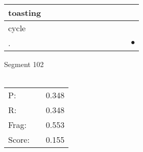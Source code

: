 \documentclass[landscape]{article}
\newcommand{\ssp}{\hspace{2pt}}
\newcommand{\mex}{\cellcolor{g}$\bullet$}
\begin{document}
\begin{tabular}{|l|p{10pt}|p{10pt}|p{10pt}|p{10pt}|p{10pt}|p{10pt}|p{10pt}|p{10pt}|p{10pt}|p{10pt}|p{10pt}|}
\hline
\ssp toasting \ssp&\hspace{2pt}&\hspace{2pt}&\hspace{2pt}&\hspace{2pt}&\hspace{2pt}&\hspace{2pt}&\hspace{2pt}&\hspace{2pt}&\hspace{2pt}&\hspace{2pt}&\hspace{2pt}\\
\hline
\ssp cycle \ssp&\hspace{2pt}&\hspace{2pt}&\hspace{2pt}&\hspace{2pt}&\hspace{2pt}&\hspace{2pt}&\hspace{2pt}&\hspace{2pt}&\hspace{2pt}&\hspace{2pt}&\hspace{2pt}\\
\hline
\ssp \cellcolor{ref10}. \ssp&\hspace{2pt}&\hspace{2pt}&\hspace{2pt}&\hspace{2pt}&\hspace{2pt}&\hspace{2pt}&\hspace{2pt}&\hspace{2pt}&\hspace{2pt}&\hspace{2pt}&\hspace{2pt}\mex\\
\hline
\end{tabular}

\vspace{6pt}
\noindent Segment 102\\\\
\noindent\begin{tabular}{lm{12pt}r}
\hline
P:&&0.348\\
R:&&0.348\\
Frag:&&0.553\\
Score:&&0.155\\
\end{tabular}
\end{document}
